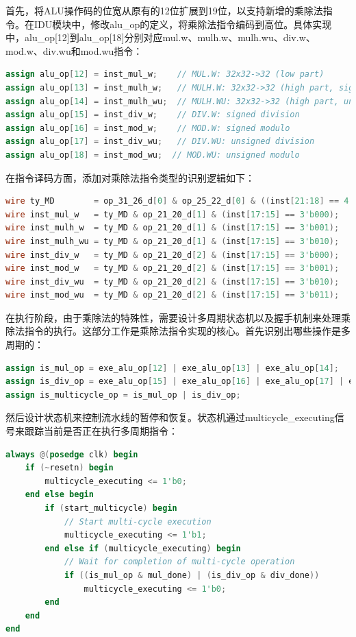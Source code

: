 \documentclass[11pt]{article}
\begin{document}
首先，将ALU操作码的位宽从原有的12位扩展到19位，以支持新增的乘除法指令。在IDU模块中，修改alu\_op的定义，将乘除法指令编码到高位。具体实现中，alu\_op[12]到alu\_op[18]分别对应mul.w、mulh.w、mulh.wu、div.w、mod.w、div.wu和mod.wu指令：

\begin{lstlisting}[language=verilog]
assign alu_op[12] = inst_mul_w;    // MUL.W: 32x32->32 (low part)
assign alu_op[13] = inst_mulh_w;   // MULH.W: 32x32->32 (high part, signed)
assign alu_op[14] = inst_mulh_wu;  // MULH.WU: 32x32->32 (high part, unsigned)
assign alu_op[15] = inst_div_w;    // DIV.W: signed division
assign alu_op[16] = inst_mod_w;    // MOD.W: signed modulo
assign alu_op[17] = inst_div_wu;   // DIV.WU: unsigned division
assign alu_op[18] = inst_mod_wu;  // MOD.WU: unsigned modulo
\end{lstlisting}

在指令译码方面，添加对乘除法指令类型的识别逻辑如下：

\begin{lstlisting}[language=verilog]
wire ty_MD        = op_31_26_d[0] & op_25_22_d[0] & ((inst[21:18] == 4'b0111) | (inst[21:18] == 4'b1000));
wire inst_mul_w   = ty_MD & op_21_20_d[1] & (inst[17:15] == 3'b000);
wire inst_mulh_w  = ty_MD & op_21_20_d[1] & (inst[17:15] == 3'b001);
wire inst_mulh_wu = ty_MD & op_21_20_d[1] & (inst[17:15] == 3'b010);
wire inst_div_w   = ty_MD & op_21_20_d[2] & (inst[17:15] == 3'b000);
wire inst_mod_w   = ty_MD & op_21_20_d[2] & (inst[17:15] == 3'b001);
wire inst_div_wu  = ty_MD & op_21_20_d[2] & (inst[17:15] == 3'b010);
wire inst_mod_wu  = ty_MD & op_21_20_d[2] & (inst[17:15] == 3'b011);
\end{lstlisting}

在执行阶段，由于乘除法的特殊性，需要设计多周期状态机以及握手机制来处理乘除法指令的执行。这部分工作是乘除法指令实现的核心。首先识别出哪些操作是多周期的：

\begin{lstlisting}[language=verilog]
assign is_mul_op = exe_alu_op[12] | exe_alu_op[13] | exe_alu_op[14];
assign is_div_op = exe_alu_op[15] | exe_alu_op[16] | exe_alu_op[17] | exe_alu_op[18];
assign is_multicycle_op = is_mul_op | is_div_op;
\end{lstlisting}

然后设计状态机来控制流水线的暂停和恢复。状态机通过multicycle\_executing信号来跟踪当前是否正在执行多周期指令：

\begin{lstlisting}[language=verilog]
always @(posedge clk) begin
    if (~resetn) begin
        multicycle_executing <= 1'b0;
    end else begin
        if (start_multicycle) begin
            // Start multi-cycle execution
            multicycle_executing <= 1'b1;
        end else if (multicycle_executing) begin
            // Wait for completion of multi-cycle operation
            if ((is_mul_op & mul_done) | (is_div_op & div_done))
                multicycle_executing <= 1'b0;
        end
    end
end
\end{lstlisting}
\end{document}

